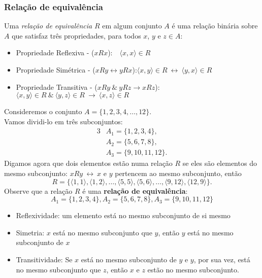 \subsubsection{Relação de equivalência}
\begin{definition}
  Uma \textit{relação de equivalência} $R$ em algum conjunto $A$ é uma relação binária sobre $A$ que satisfaz três propriedades, para todos $x$, $y$ e $z \in A$:
    \begin{itemize}
      \item Propriedade Reflexiva - ($xRx$):\quad \quad \quad \quad \quad \quad \quad\ \ $\langle x, x \rangle \in R$
      \item Propriedade Simétrica - ($xRy \leftrightarrow yRx$):\quad \quad \quad \quad $\langle x, y \rangle \in R\ \leftrightarrow\ \langle y, x \rangle \in R$
      \item Propriedade Transitiva - ($xRy\ \&\ yRz \rightarrow xRz$):\quad $\langle x, y \rangle \in R\ \&\ \langle y, z \rangle \in R\ \rightarrow\ \langle x, z \rangle \in R$
    \end{itemize}
\end{definition}
\begin{exmp}
  Consideremos o conjunto $A = \{1,2,3,4, \dots , 12\}.$\\
  Vamos dividi-lo em três subconjuntos:
    \begin{alignat*}{3}
      &A_{1} = \{1,2,3,4\},\\
      &A_{2} = \{5,6,7,8\},\\
      &A_{3} = \{9,10,11,12\}.
    \end{alignat*}
  Digamos agora que dois elementos estão numa relação $R$ se eles são elementos do mesmo subconjunto:
  $xRy\ \leftrightarrow\ x$ e $y$ pertencem ao mesmo subconjunto, então
  $$R = \{\langle 1,1 \rangle , \langle 1,2 \rangle , \dots , \langle 5,5 \rangle , \langle 5,6 \rangle , \dots , \langle 9,12 \rangle , \langle 12,9 \rangle \}.$$
  Observe que a relação $R$ é uma \textbf{relação de equivalência}:
  $$A_{1} = \{1,2,3,4\}, A_{2} = \{5,6,7,8\}, A_{3} = \{9,10,11,12\}$$
    \begin{itemize}
      \item Reflexividade: um elemento está no mesmo subconjunto de si mesmo
      \item Simetria: $x$ está no mesmo subconjunto que $y$, então $y$ está no mesmo subconjunto de $x$
      \item Transitividade: Se $x$ está no mesmo subconjunto de $y$ e $y$, por sua vez, está no mesmo subconjunto que $z$, então $x$ e $z$ estão no mesmo subconjunto.
    \end{itemize}
\end{exmp}


